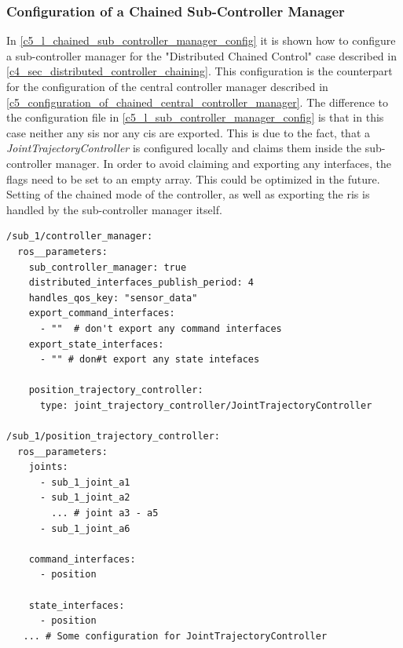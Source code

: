 \subsubsection{Configuration of a Chained Sub-Controller Manager}\label{c5_sec_sub_chained_controller_configuration}
In \autoref{c5_l_chained_sub_controller_manager_config} it is shown how to configure a sub-controller manager for the "Distributed Chained Control" case described in \autoref{c4_sec_distributed_controller_chaining}. This configuration is the counterpart for the configuration of the central controller manager described in \autoref{c5_configuration_of_chained_central_controller_manager}.\newline
The difference to the configuration file in \autoref{c5_l_sub_controller_manager_config} is that in this case neither any \glspl{si} nor any \glspl{ci} are exported. This is due to the fact, that a \textit{JointTrajectoryController} is configured locally and claims them inside the sub-controller manager. In order to avoid claiming and exporting any interfaces, the flags need to be set to an empty array. This could be optimized in the future. Setting of the chained mode of the controller, as well as exporting the \glspl{ri} is handled by the sub-controller manager itself. 
\lstset{language=yaml,basicstyle=\small}
\begin{lstlisting}[caption=Example configuration of a chained sub-controller manager.,label=c5_l_chained_sub_controller_manager_config]
/sub_1/controller_manager:
  ros__parameters:
    sub_controller_manager: true
    distributed_interfaces_publish_period: 4
    handles_qos_key: "sensor_data"
    export_command_interfaces:
      - ""  # don't export any command interfaces
    export_state_interfaces:
      - "" # don#t export any state intefaces

    position_trajectory_controller:
      type: joint_trajectory_controller/JointTrajectoryController

/sub_1/position_trajectory_controller:
  ros__parameters:
    joints:
      - sub_1_joint_a1
      - sub_1_joint_a2
        ... # joint a3 - a5
      - sub_1_joint_a6

    command_interfaces:
      - position

    state_interfaces:
      - position
   ... # Some configuration for JointTrajectoryController 
\end{lstlisting}